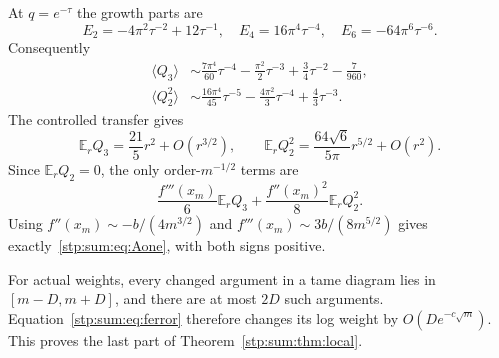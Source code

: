\documentclass[11pt]{article}
\theoremstyle{remark}\newtheorem{remark}[theorem]{Remark}
\newcommand{\E}{\mathbb E}
\begin{document}
At $q=e^{-\tau}$ the growth parts are
\[
 E_2=-4\pi^2\tau^{-2}+12\tau^{-1},\quad
 E_4=16\pi^4\tau^{-4},\quad E_6=-64\pi^6\tau^{-6}.
\]
Consequently
\begin{align*}
 \langle Q_3\rangle&\sim\frac{7\pi^4}{60}\tau^{-4}
     -\frac{\pi^2}{2}\tau^{-3}+\frac34\tau^{-2}-\frac7{960},\\
 \langle Q_2^2\rangle&\sim\frac{16\pi^4}{45}\tau^{-5}
     -\frac{4\pi^2}{3}\tau^{-4}+\frac43\tau^{-3}.
\end{align*}
The controlled transfer gives
\[
 \E_rQ_3=\frac{21}5r^2+O(r^{3/2}),\qquad
 \E_rQ_2^2=\frac{64\sqrt6}{5\pi}r^{5/2}+O(r^2).
\]
Since $\E_rQ_2=0$, the only order-$m^{-1/2}$ terms are
\[
 \frac{f'''(x_m)}6\E_rQ_3+\frac{f''(x_m)^2}8\E_rQ_2^2.
\]
Using $f''(x_m)\sim-b/(4m^{3/2})$ and $f'''(x_m)\sim3b/(8m^{5/2})$ gives exactly~\eqref{stp:sum:eq:Aone}, with both signs positive.

For actual weights, every changed argument in a tame diagram lies in $[m-D,m+D]$, and there are at most $2D$ such arguments. Equation~\eqref{stp:sum:eq:ferror} therefore changes its log weight by $O(De^{-c\sqrt m})$. This proves the last part of Theorem~\ref{stp:sum:thm:local}.
\end{document}
